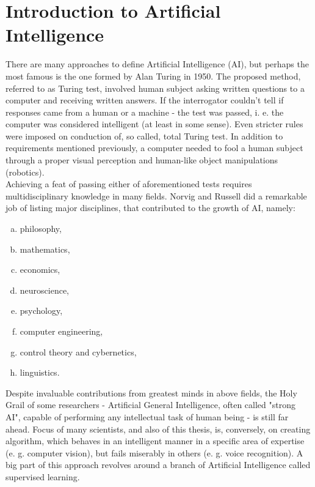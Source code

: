 \documentclass[11pt]{article}
\begin{document}
\section{Introduction to Artificial Intelligence} \label{introduction_to_ai}
There are many approaches to define Artificial Intelligence (AI), but perhaps the most famous is the one formed by Alan Turing in 1950. The proposed method, referred to as Turing test, involved human subject asking written questions to a computer and receiving written answers. If the interrogator couldn't tell if responses came from a human or a machine - the test was passed, i. e. the computer was considered intelligent (at least in some sense). Even stricter rules were imposed on conduction of, so called, total Turing test. In addition to requirements mentioned previously, a computer needed to fool a human subject through a proper visual perception and human-like object manipulations (robotics).\\

Achieving a feat of passing either of aforementioned tests requires multidisciplinary knowledge in many fields. Norvig and Russell \cite{ai_modern_approach} did a remarkable job of listing major disciplines, that contributed to the growth of AI, namely:
\begin{enumerate}[a)]
\item philosophy,
\item mathematics,
\item economics,
\item neuroscience,
\item psychology,
\item computer engineering,
\item control theory and cybernetics,
\item linguistics.
\end{enumerate}
Despite invaluable contributions from greatest minds in above fields, the Holy Grail of some researchers - Artificial General Intelligence, often called "strong AI", capable of performing any intellectual task of human being - is still far ahead. Focus of many scientists, and also of this thesis, is, conversely, on creating algorithm, which behaves in an intelligent manner in a specific area of expertise (e. g. computer vision), but fails miserably in others (e. g. voice recognition). A big part of this approach revolves around a branch of Artificial Intelligence called supervised learning. \\
\end{document}
